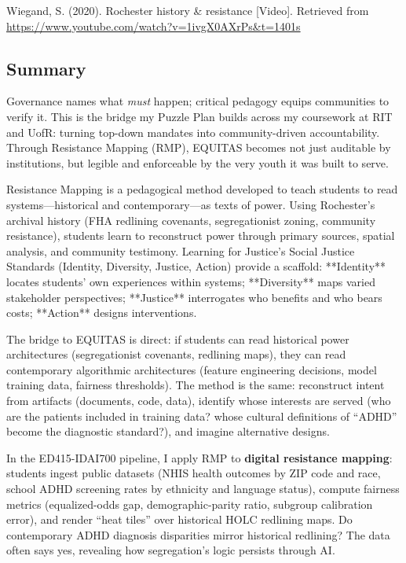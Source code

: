 \documentclass[12pt,twoside]{article}
\begin{document}
Wiegand, S. (2020). Rochester history \& resistance [Video]. Retrieved from \href{https://www.youtube.com/watch?v=1ivgX0AXrPs\&t=1401s}{https://www.youtube.com/watch?v=1ivgX0AXrPs\&t=1401s}

\subsection*{Summary}

Governance names what \emph{must} happen; critical pedagogy equips communities to verify it. This is the bridge my Puzzle Plan builds across my coursework at RIT and UofR: turning top-down mandates into community-driven accountability. Through Resistance Mapping (RMP), EQUITAS becomes not just auditable by institutions, but legible and enforceable by the very youth it was built to serve.

Resistance Mapping is a pedagogical method developed to teach students to read systems—historical and contemporary—as texts of power. Using Rochester's archival history (FHA redlining covenants, segregationist zoning, community resistance), students learn to reconstruct power through primary sources, spatial analysis, and community testimony. Learning for Justice's Social Justice Standards (Identity, Diversity, Justice, Action) provide a scaffold: **Identity** locates students' own experiences within systems; **Diversity** maps varied stakeholder perspectives; **Justice** interrogates who benefits and who bears costs; **Action** designs interventions.

The bridge to EQUITAS is direct: if students can read historical power architectures (segregationist covenants, redlining maps), they can read contemporary algorithmic architectures (feature engineering decisions, model training data, fairness thresholds). The method is the same: reconstruct intent from artifacts (documents, code, data), identify whose interests are served (who are the patients included in training data? whose cultural definitions of ``ADHD'' become the diagnostic standard?), and imagine alternative designs.

In the ED415-IDAI700 pipeline, I apply RMP to \textbf{digital resistance mapping}: students ingest public datasets (NHIS health outcomes by ZIP code and race, school ADHD screening rates by ethnicity and language status), compute fairness metrics (equalized-odds gap, demographic-parity ratio, subgroup calibration error), and render ``heat tiles'' over historical HOLC redlining maps. Do contemporary ADHD diagnosis disparities mirror historical redlining? The data often says yes, revealing how segregation's logic persists through AI.
\end{document}
